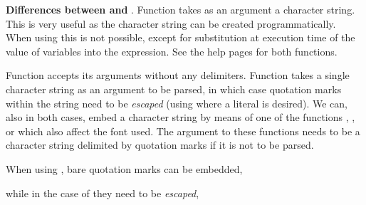 \documentclass[krantz2]{krantz}\usepackage{knitr}
\begin{document}
\begin{explainbox}
\textbf{Differences between  and }. Function  takes as an argument a character string. This is very useful as the character string can be created programmatically. When using  this is not possible, except for substitution at execution time of the value of variables into the expression. See the help pages for both functions.

Function  accepts its arguments without any delimiters. Function  takes a single character string as an argument to be parsed, in which case quotation marks within the string need to be \emph{escaped} (using  where a literal  is desired). We can, also in both cases, embed a character string by means of one of the functions , ,  or  which also affect the font used. The argument to these functions needs to be a character string delimited by quotation marks if it is not to be parsed.

When using , bare quotation marks can be embedded,

\begin{knitrout}\footnotesize
{}\color{fgcolor}\begin{kframe}
\begin{alltt}
  \hlopt{+}
  \hlstd{()} \hlopt{+}
  \hlstd{(}\hlstd{(x[}\hlstd{]}\hlopt{*}\hlstd{))}
\end{alltt}
\end{kframe}
\end{knitrout}

while in the case of  they need to be \emph{escaped},

\begin{knitrout}\footnotesize
{}\color{fgcolor}\begin{kframe}
\begin{alltt}
  \hlopt{+}
  \hlstd{()} \hlopt{+}
  \hlstd{(}\hlstd{(} \hlstd{=} \hlstd{))}
\end{alltt}
\end{kframe}
\end{knitrout}


\end{explainbox}
\end{document}
